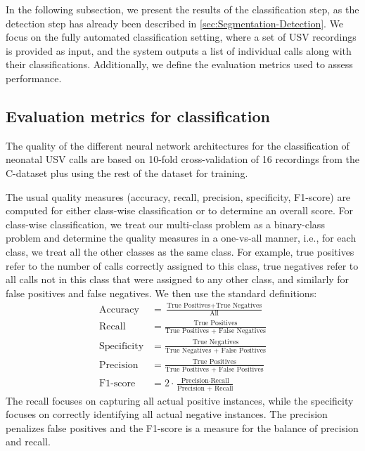 \documentclass[preprint,NumberedRefs]{JASA}
\begin{document}
In the following subsection, we present the results of the classification step, as the detection step has already been described in \autoref{sec:Segmentation-Detection}. We focus on the fully automated classification setting, where a set of USV recordings is provided as input, and the system outputs a list of individual calls along with their classifications. Additionally, we define the evaluation metrics used to assess performance.

\subsection{Evaluation metrics for classification}
\label{sec:Evaluation_metrics_for_classification}

The quality of the different neural network architectures for the classification of neonatal USV calls are based on 10-fold cross-validation of 16 recordings from the C-dataset plus using the rest of the dataset for training.

The usual quality measures (accuracy, recall, precision, specificity, F1-score) are computed for either class-wise classification or to determine an overall score. For class-wise classification, we treat our multi-class problem as a binary-class problem and determine the quality measures in a one-vs-all manner, i.e., for each class, we treat all the other classes as the same class. For example, true positives refer to the number of calls correctly assigned to this class, true negatives refer to all calls not in this class that were assigned to any other class, and similarly for false positives and false negatives. We then use the standard definitions:
\begin{align*}
    \text{Accuracy} &= \frac{\text{True Positives} + \text{True Negatives}}{\text{All}}\\
    \text{Recall} &= \frac{\text{True Positives}}{\text{True Positives + False Negatives}}\\
    \text{Specificity} &= \frac{\text{True Negatives}}{\text{True Negatives + False Positives}}\\
    \text{Precision} &= \frac{\text{True Positives}}{\text{True Positives + False Positives}}\\
    \text{F1-score} &= 2 \cdot \frac{\text{Precision} \cdot \text{Recall}}{\text{Precision + Recall}}
\end{align*}
The recall focuses on capturing all actual positive instances, while the specificity focuses on correctly identifying all actual negative instances.
The precision penalizes false positives and the F1-score is a measure for the balance of precision and recall.
\end{document}
